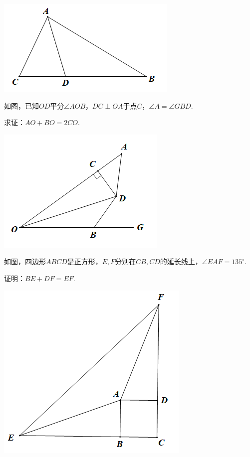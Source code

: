 \documentclass[10pt]{ctexart}
\begin{document}
\begin{flushright}
	\includegraphics[scale=0.6]{figure/jiechangbuduan02}
\end{flushright}

\begin{shaded}
	\begin{example}
	如图，已知$OD$平分$\angle AOB$，$DC\perp OA$于点$C$，$\angle A=\angle GBD$.
	
	求证：$AO+BO=2CO$.
	\end{example}
\end{shaded}

\begin{flushright}
	\includegraphics[scale=0.6]{figure/jiechangbuduan03}
\end{flushright}

\begin{shaded}
	\begin{example}
	如图，四边形$ABCD$是正方形，$E,F$分别在$CB,CD$的延长线上，$\angle EAF=135^\circ$.
	
	证明：$BE+DF=EF$.
	\end{example}
\end{shaded}

\begin{flushright}
	\includegraphics[scale=0.6]{figure/jiechangbuduan11}
\end{flushright}
\end{document}
